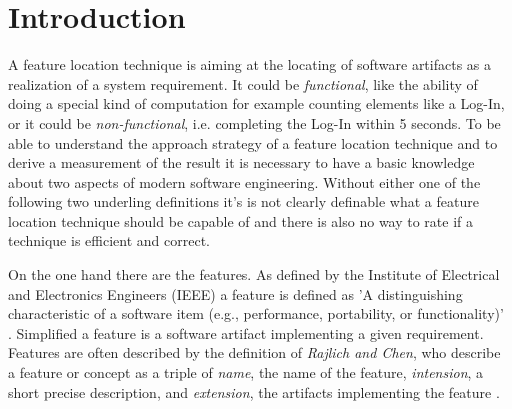 \chapter{Introduction}


A feature location technique is aiming at the locating of software artifacts as a realization of a system requirement. It could be \emph{functional}, like the ability of doing a special kind of computation for example counting elements like a Log-In, or it could be \emph{non-functional}, i.e. completing the Log-In within 5 seconds.
To be able to understand the approach strategy of a feature location technique and to derive a measurement of the result it is necessary to have a basic knowledge about two aspects of modern software engineering. Without either one of the following two underling definitions it's is not clearly definable what a feature location technique should be capable of and there is also no way to rate if a technique is efficient and correct.

On the one hand there are the features. As defined by the Institute of Electrical and Electronics Engineers (IEEE) a feature is defined as 'A distinguishing characteristic of a software item (e.g., performance, portability, or functionality)' \cite{wiki:Softwarefeature}. Simplified a feature is a software artifact implementing a given requirement. Features are often described by the definition of \emph{Rajlich and Chen}, who describe a feature or concept as a triple of \textit{name}, the name of the feature, \textit{intension}, a short precise description, and \textit{extension}, the artifacts implementing the feature \cite{KR00} \label{Rajlich_Chen}.

